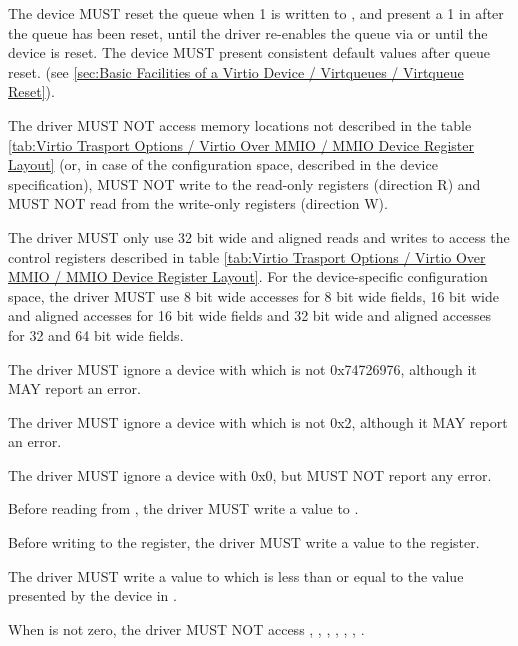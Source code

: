 The device MUST reset the queue when 1 is written to , and
present a 1 in  after the queue has been reset, until the
driver re-enables the queue via  or until the device is reset.
The device MUST present consistent default values after queue reset.
(see \ref{sec:Basic Facilities of a Virtio Device / Virtqueues / Virtqueue Reset}).

The driver MUST NOT access memory locations not described in the
table \ref{tab:Virtio Trasport Options / Virtio Over MMIO / MMIO Device Register Layout}
(or, in case of the configuration space, described in the device specification),
MUST NOT write to the read-only registers (direction R) and
MUST NOT read from the write-only registers (direction W).

The driver MUST only use 32 bit wide and aligned reads and writes to access the control registers
described in table \ref{tab:Virtio Trasport Options / Virtio Over MMIO / MMIO Device Register Layout}.
For the device-specific configuration space, the driver MUST use 8 bit wide accesses for
8 bit wide fields, 16 bit wide and aligned accesses for 16 bit wide fields and 32 bit wide and
aligned accesses for 32 and 64 bit wide fields.

The driver MUST ignore a device with  which is not 0x74726976,
although it MAY report an error.

The driver MUST ignore a device with  which is not 0x2,
although it MAY report an error.

The driver MUST ignore a device with  0x0,
but MUST NOT report any error.

Before reading from , the driver MUST write a value to .

Before writing to the  register, the driver MUST write a value to the  register.

The driver MUST write a value to  which is less than
or equal to the value presented by the device in .

When  is not zero, the driver MUST NOT access
, , ,
, , , .


